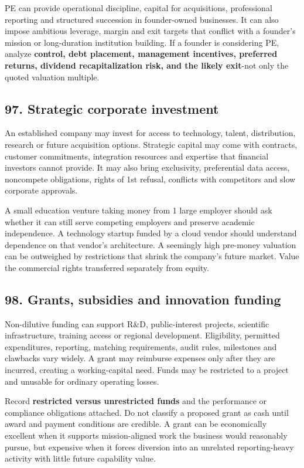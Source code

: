 PE can provide operational discipline, capital for acquisitions, professional reporting and structured succession in founder-owned businesses. It can also impose ambitious leverage, margin and exit targets that conflict with a founder's mission or long-duration institution building. If a founder is considering PE, analyze \textbf{control, debt placement, management incentives, preferred returns, dividend recapitalization risk, and the likely exit}-not only the quoted valuation multiple.

\subsection{97. Strategic corporate investment}


An established company may invest for access to technology, talent, distribution, research or future acquisition options. Strategic capital may come with contracts, customer commitments, integration resources and expertise that financial investors cannot provide. It may also bring exclusivity, preferential data access, noncompete obligations, rights of 1st refusal, conflicts with competitors and slow corporate approvals.

A small education venture taking money from 1 large employer should ask whether it can still serve competing employers and preserve academic independence. A technology startup funded by a cloud vendor should understand dependence on that vendor's architecture. A seemingly high pre-money valuation can be outweighed by restrictions that shrink the company's future market. Value the commercial rights transferred separately from equity.

\subsection{98. Grants, subsidies and innovation funding}


Non-dilutive funding can support R\&D, public-interest projects, scientific infrastructure, training access or regional development. Eligibility, permitted expenditures, reporting, matching requirements, audit rules, milestones and clawbacks vary widely. A grant may reimburse expenses only after they are incurred, creating a working-capital need. Funds may be restricted to a project and unusable for ordinary operating losses.

Record \textbf{restricted versus unrestricted funds} and the performance or compliance obligations attached. Do not classify a proposed grant as cash until award and payment conditions are credible. A grant can be economically excellent when it supports mission-aligned work the business would reasonably pursue, but expensive when it forces diversion into an unrelated reporting-heavy activity with little future capability value.

